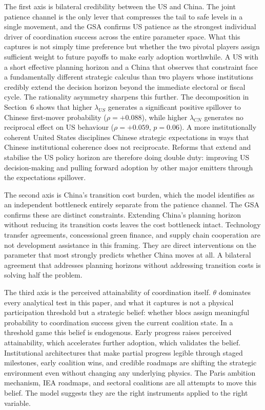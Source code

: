 \documentclass[10pt,a4paper]{article}
\begin{document}
The first axis is bilateral credibility between the US and China. The joint patience channel is the only
lever that compresses the tail to safe levels in a single movement, and the GSA confirms US patience as
the strongest individual driver of coordination success across the entire parameter space. What this
captures is not simply time preference but whether the two pivotal players assign sufficient weight to
future payoffs to make early adoption worthwhile. A US with a short effective planning horizon and a
China that observes that constraint face a fundamentally different strategic calculus than two players
whose institutions credibly extend the decision horizon beyond the immediate electoral or fiscal cycle.
The rationality asymmetry sharpens this further. The decomposition in Section~6 shows that
higher $\lambda_{US}$ generates a significant positive spillover to Chinese first-mover probability
($\rho = +0.088$), while higher $\lambda_{CN}$ generates no reciprocal effect on US behaviour
($\rho = +0.059$, $p = 0.06$). A more institutionally coherent United States disciplines Chinese
strategic expectations in ways that Chinese institutional coherence does not reciprocate. Reforms
that extend and stabilise the US policy horizon are therefore doing double duty: improving US
decision-making and pulling forward adoption by other major emitters through the expectations
spillover.

The second axis is China's transition cost burden, which the model identifies as an independent bottleneck
entirely separate from the patience channel. The GSA confirms these are distinct constraints. Extending
China's planning horizon without reducing its transition costs leaves the cost bottleneck intact.
Technology transfer agreements, concessional green finance, and supply chain cooperation are not
development assistance in this framing. They are direct interventions on the parameter that most strongly
predicts whether China moves at all. A bilateral agreement that addresses planning horizons without
addressing transition costs is solving half the problem.

The third axis is the perceived attainability of coordination itself. $\theta$ dominates every analytical test in
this paper, and what it captures is not a physical participation threshold but a strategic belief: whether
blocs assign meaningful probability to coordination success given the current coalition state. In a threshold
game this belief is endogenous. Early progress raises perceived attainability, which accelerates further
adoption, which validates the belief. Institutional architectures that make partial progress legible through
staged milestones, early coalition wins, and credible roadmaps are shifting the strategic environment even
without changing any underlying physics. The Paris ambition mechanism, IEA roadmaps, and sectoral
coalitions are all attempts to move this belief. The model suggests they are the right instruments applied
to the right variable.
\end{document}
